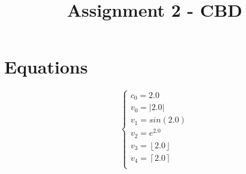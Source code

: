 \documentclass[a4paper,12pt]{article}
\begin{document}
\title{Assignment 2 - CBD}\date{}\maketitle
\section{Equations}
\[
\left\{
\begin{array}{c}
c_0 = 2.0 \\
v_0 = \lvert2.0\rvert \\
v_1 = sin(2.0) \\
v_2 = e^{2.0} \\
v_3 = \left \lfloor{2.0}\right \rfloor \\
v_4 = \left \lceil{2.0}\right \rceil \\
\end{array}
\right.
\]
\end{document}

